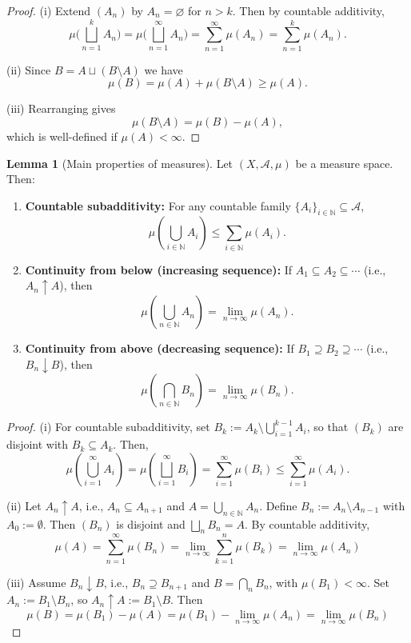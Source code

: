 \documentclass[12pt]{article}
\theoremstyle{definition}
\newtheorem{lemma}[theorem]{Lemma}
\begin{document}
\begin{proof}
(i) Extend \((A_n)\) by \(A_n = \varnothing\) for \(n > k\). Then by countable additivity,
\[
\mu\big(\bigsqcup_{n=1}^k A_n\big) = \mu\big(\bigsqcup_{n=1}^\infty A_n\big) = \sum_{n=1}^\infty \mu(A_n) = \sum_{n=1}^k \mu(A_n).
\]

(ii) Since \(B = A \sqcup (B \setminus A)\) we have
\[
\mu(B) = \mu(A) + \mu(B \setminus A) \geq \mu(A).
\]

(iii) Rearranging gives
\[
\mu(B \setminus A) = \mu(B) - \mu(A),
\]
which is well-defined if \(\mu(A) < \infty\).
\end{proof}


\medskip
\begin{lemma}[Main properties of measures]
Let \((X, \mathcal{A}, \mu)\) be a measure space. Then:
\medskip
\begin{enumerate}
    \item[(i)] \textbf{Countable subadditivity:} For any countable family \(\{A_i\}_{i \in \mathbb{N}} \subseteq \mathcal{A}\),
    \[
    \mu\left( \bigcup_{i \in \mathbb{N}} A_i \right) \leq \sum_{i \in \mathbb{N}} \mu(A_i).
    \]

    \item[(ii)] \textbf{Continuity from below (increasing sequence):} If \(A_1 \subseteq A_2 \subseteq \cdots\) (i.e., \(A_n \uparrow A\)), then
    \[
    \mu\left( \bigcup_{n \in \mathbb{N}} A_n \right) = \lim_{n \to \infty} \mu(A_n).
    \]

    \item[(iii)] \textbf{Continuity from above (decreasing sequence):} If \(B_1 \supseteq B_2 \supseteq \cdots\) (i.e., \(B_n \downarrow B\)), then
    \[
    \mu\left( \bigcap_{n \in \mathbb{N}} B_n \right) = \lim_{n \to \infty} \mu(B_n).
    \]
\end{enumerate}
\end{lemma}

\medskip
\begin{proof}
(i) For countable subadditivity, set \(B_k := A_k \setminus \bigcup_{i=1}^{k-1} A_i\), so that \((B_k)\) are disjoint with \(B_k \subseteq A_k\). Then,
\[
\mu\left(\bigcup_{i=1}^\infty A_i\right) = \mu\left(\bigsqcup_{i=1}^\infty B_i\right) = \sum_{i=1}^\infty \mu(B_i) \leq \sum_{i=1}^\infty \mu(A_i).
\]

\vspace{3em}
(ii) Let \( A_n \uparrow A \), i.e., \( A_n \subseteq A_{n+1} \) and \( A = \bigcup_{n \in \mathbb{N}} A_n \). Define \( B_n := A_n \setminus A_{n-1} \) with \( A_0 := \emptyset \). Then \( (B_n) \) is disjoint and \( \bigsqcup_{n} B_n = A \). By countable additivity,
\[
\mu(A) = \sum_{n=1}^\infty \mu(B_n) = \lim_{n \to \infty} \sum_{k=1}^n \mu(B_k) = \lim_{n \to \infty} \mu(A_n) 
\]

\vspace{3em}
(iii) Assume \(B_n \downarrow B\), i.e., \(B_n \supseteq B_{n+1}\) and \(B = \bigcap_{n} B_n\), with \(\mu(B_1) < \infty\). Set \(A_n := B_1 \setminus B_n\), so \(A_n \uparrow A := B_1 \setminus B\). Then
\[
\mu(B) = \mu(B_1) - \mu(A) = \mu(B_1) - \lim_{n \to \infty} \mu(A_n) = \lim_{n \to \infty} \mu(B_n)
\]
\end{proof}
\end{document}
